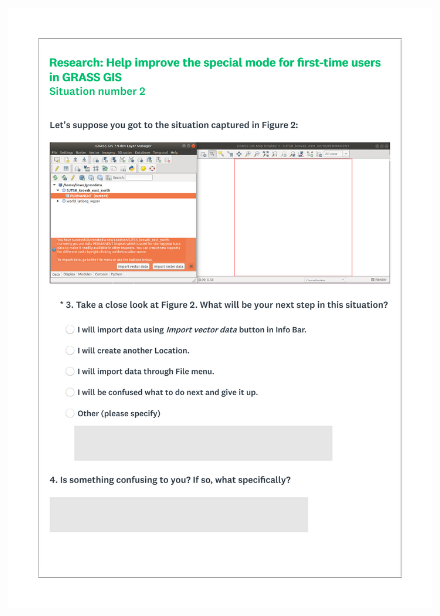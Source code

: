 \documentclass[a4paper,10pt,twoside]{article}
\begin{document}
 \newpage
 \begin{figure}[hbt!]
 \begin{center}
 \includegraphics[width=15.5cm]{../surveys/questionnaires/survey2-page4_questions3_4.pdf}
 \end{center}
 \end{figure}
 
\end{document}
